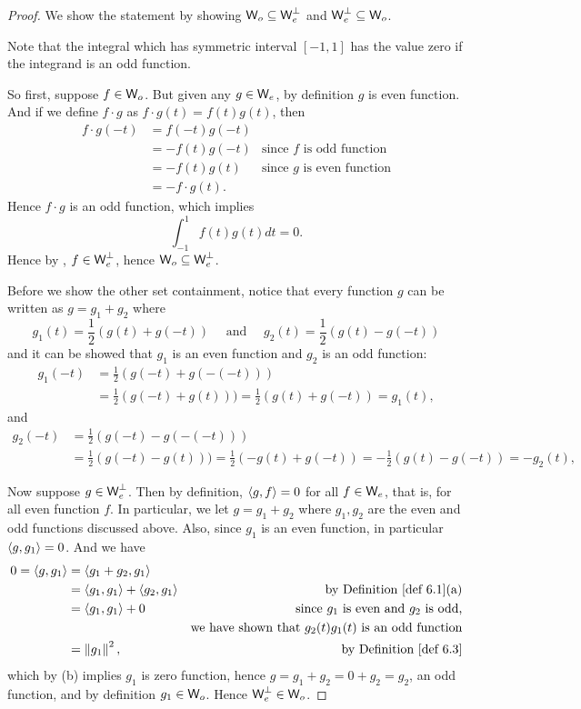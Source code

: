 \begin{proof}
We show the statement by showing \(\textsf{W}_o \subseteq \textsf{W}_e^{\perp}\) and \(\textsf{W}_e^{\perp} \subseteq \textsf{W}_o\).

Note that the integral which has symmetric interval \([-1, 1]\) has the value zero if the integrand is an odd function.

So first, suppose \(f \in \textsf{W}_o\).
But given any \(g \in \textsf{W}_e\), by definition \(g\) is even function.
And if we define \(f \cdot g\) as \(f \cdot g (t) = f(t)g(t)\), then
\begin{align*}
    f \cdot g(-t) & = f(-t)g(-t) \\
        & = -f(t)g(-t) & \text{since \(f\) is odd function} \\
        & = -f(t)g(t) & \text{since \(g\) is even function} \\
        & = - f \cdot g(t).
\end{align*}
Hence \(f \cdot g\) is an odd function, which implies
\[
    \int_{-1}^1 f(t)g(t) dt = 0.
\]
Hence by , \(f \in \textsf{W}_e^{\perp}\), hence \(\textsf{W}_o \subseteq \textsf{W}_e^{\perp}\).

Before we show the other set containment, notice that every function \(g\) can be written as \(g = g_1 + g_2\) where
\[
    g_1(t) = \frac{1}{2} (g(t) + g(-t)) \quad \text{ and } \quad g_2(t) = \frac{1}{2} (g(t) - g(-t))
\]
and it can be showed that \(g_1\) is an even function and \(g_2\) is an odd function:
\begin{align*}
    g_1(-t) & = \frac{1}{2} (g(-t) + g(-(-t))) \\
        & = \frac{1}{2} (g(-t) + g(t))) = \frac{1}{2} (g(t) + g(-t)) = g_1(t),
\end{align*}
and
\begin{align*}
    g_2(-t) & = \frac{1}{2} (g(-t) - g(-(-t))) \\
        & = \frac{1}{2} (g(-t) - g(t))) = \frac{1}{2} (-g(t) + g(-t)) = -\frac{1}{2} (g(t) - g(-t)) = -g_2(t),
\end{align*}

Now suppose \(g \in \textsf{W}_e^{\perp}\).
Then by definition, \(\left< g, f \right> = 0\) for all \(f \in \textsf{W}_e\), that is, for all even function \(f\).
In particular, we let \(g = g_1 + g_2\) where \(g_1, g_2\) are the even and odd functions discussed above.
Also, since \(g_1\) is an even function, in particular \(\left< g, g_1 \right> = 0\).
And we have
\begin{align*}
    0 = \LG g, g_1 \RG & = \LG g_1 + g_2, g_1 \RG \\
        & = \LG g_1, g_1 \RG + \LG g_2, g_1 \RG & \text{by \DEF{6.1}(a)} \\
        & = \LG g_1, g_1 \RG + 0 & \text{since \(g_1\) is even and \(g_2\) is odd,} \\
        & & \text{we have shown that \(g_2(t)g_1(t)\) is an odd function} \\
        & = \norm{g_1}^2, & \text{by \DEF{6.3}}
\end{align*}
which by (b) implies \(g_1\) is zero function, hence \(g = g_1 + g_2 = 0 + g_2 = g_2\), an odd function, and by definition \(g_1 \in \textsf{W}_o\).
Hence \(\textsf{W}_e^{\perp} \in \textsf{W}_o\).
\end{proof}

